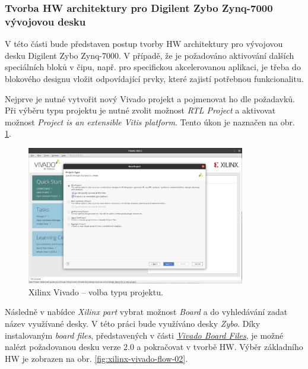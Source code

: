 \documentclass[a4paper, twoside, 11pt]{article}
\begin{document}
		\subsubsection{Tvorba HW architektury pro Digilent Zybo Zynq-7000 vývojovou desku}
		V této části bude představen postup tvorby HW architektury pro vývojovou desku Digilent Zybo Zynq-7000. V případě, že je požadováno aktivování dalších speciálních bloků v čipu, např. pro specifickou akcelerovanou aplikaci, je třeba do blokového designu vložit odpovídající prvky, které zajistí potřebnou funkcionalitu.\par
		Nejprve je nutné vytvořit nový Vivado projekt a pojmenovat ho dle požadavků. Při výběru typu projektu je nutné zvolit možnost \textit{RTL Project} a aktivovat možnost \textit{Project is an extensible Vitis platform}. Tento úkon je naznačen na obr. \ref{fig:xilinx-vivado-flow-01}.

			\begin{figure}[htbp!]
				\centering
				\includegraphics[width=0.85\textwidth]{src/png/xilinx-vivado-flow/xilinx-vivado-flow-01.png}
				\caption{Xilinx Vivado – volba typu projektu.}
				\label{fig:xilinx-vivado-flow-01}
			\end{figure}

		Následně v nabídce \textit{Xilinx part} vybrat možnost \textit{Board} a do vyhledávání zadat název využívané desky. V této práci bude využíváno desky \textit{Zybo}. Díky instalovaným \textit{board files}, představených v části \hyperref[subsubsec:vivado-board-files]{\textit{Vivado Board Files}}, je možné nalézt požadovanou desku verze 2.0 a pokračovat v tvorbě HW. Výběr základního HW je zobrazen na obr. \ref{fig:xilinx-vivado-flow-02}.
\end{document}

